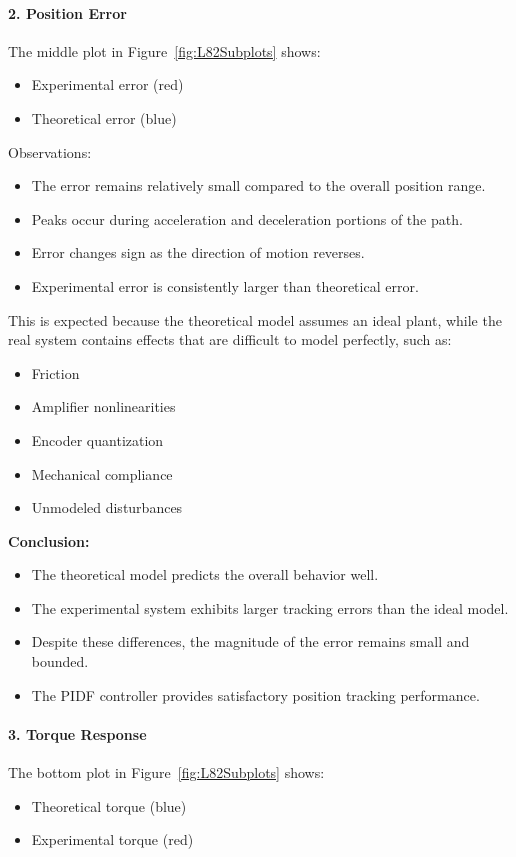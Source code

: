 \documentclass[10pt,twocolumn]{article}
\begin{document}
\paragraph{2. Position Error}
The middle plot in Figure~\ref{fig:L82Subplots} shows:
\begin{itemize}
\item Experimental error (red)
\item Theoretical error (blue)
\end{itemize}

Observations:
\begin{itemize}
\item The error remains relatively small compared to the overall position range.
\item Peaks occur during acceleration and deceleration portions of the path.
\item Error changes sign as the direction of motion reverses.
\item Experimental error is consistently larger than theoretical error.
\end{itemize}

This is expected because the theoretical model assumes an ideal plant, while the real system contains effects that are difficult to model perfectly, such as:
\begin{itemize}
\item Friction
\item Amplifier nonlinearities
\item Encoder quantization
\item Mechanical compliance
\item Unmodeled disturbances
\end{itemize}

\textbf{Conclusion:}
\begin{itemize}
\item The theoretical model predicts the overall behavior well.
\item The experimental system exhibits larger tracking errors than the ideal model.
\item Despite these differences, the magnitude of the error remains small and bounded.
\item The PIDF controller provides satisfactory position tracking performance.
\end{itemize}

\paragraph{3. Torque Response}
The bottom plot in Figure~\ref{fig:L82Subplots} shows:
\begin{itemize}
\item Theoretical torque (blue)
\item Experimental torque (red)
\end{itemize}
\end{document}
